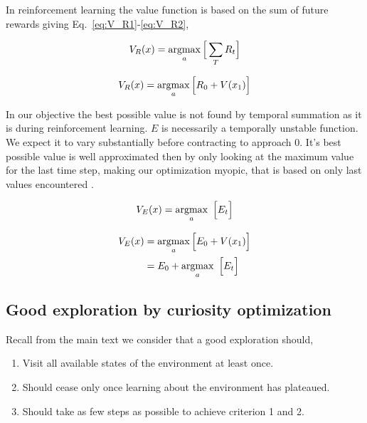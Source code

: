 In reinforcement learning the value function is based on the sum of future rewards giving Eq.~\ref{eq:V_R1}-\ref{eq:V_R2},

\begin{equation}
	\label{eq:V_R1}
	V_R(x) = \operatorname*{argmax}_a \Big [ \sum_T R_t \Big ]
\end{equation}

\begin{equation}
	\label{eq:V_R2}
	V_R(x) = \operatorname*{argmax}_a \Big [ R_0 + V(x_1) \Big ] \\
\end{equation}

In our objective the best possible value is not found by temporal summation as it is during reinforcement learning. $E$ is necessarily a temporally unstable function. We expect it to vary substantially before contracting to approach 0. It's best possible value is well approximated then by only looking at the maximum value for the last time step, making our optimization myopic, that is based on only last values encountered \citep{Hocker2019}.

\begin{equation}
	\label{eq:V_E1} 
	V_E(x) = \operatorname*{argmax}_a \ \Big [ E_t \Big ]
\end{equation}

\begin{equation}
	\label{eq:V_E2} 
	\begin{split}
	V_E(x) &= \operatorname*{argmax}_a \Big [ E_0 + V(x_1) \Big ] \\
		   &= E_0 + \operatorname*{argmax}_a \ \Big [ E_t \Big ] \\
	\end{split}
\end{equation}

\subsection*{Good exploration by curiosity optimization} 

Recall from the main text we consider that a good exploration should,

\begin{enumerate}
  \item Visit all available states of the environment at least once. 
  \item Should cease only once learning about the environment has plateaued. 
  \item Should take as few steps as possible to achieve criterion 1 and 2.
\end{enumerate}

